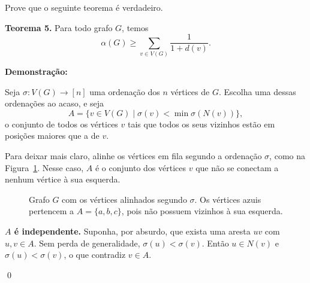 \documentclass[12pt]{article}
\newenvironment{problem}[2][Exercício]{\begin{trivlist}
\item[\hskip \labelsep {\bfseries #1}\hskip \labelsep {\bfseries #2.}]}{\end{trivlist}}
\newenvironment{sol}
    {\textbf{Demonstração:}\emph{}
    }
    {
    \qed
    }
\begin{document}
\begin{problem}{10}
    Prove que o seguinte teorema é verdadeiro.
    
    \textbf{Teorema 5.} Para todo grafo $G$, temos
    \[
        \alpha(G) \ge \sum_{v \in V(G)} \frac{1}{1 + d(v)}.
    \]
\end{problem}
\begin{sol}
    Seja $\sigma: V(G)\rightarrow [n]$ uma ordenação dos $n$ vértices de $G$. Escolha uma dessas ordenações ao acaso, e seja
    \[
        A = \{ v\in V(G) \mid \sigma(v) < \min \sigma(N(v)) \},
    \]
    o conjunto de todos os vértices $v$ tais que todos os seus vizinhos estão em posições maiores que a de $v$.

    Para deixar mais claro, alinhe os vértices em fila segundo a ordenação $\sigma$, como na Figura~\ref{fig:grafo}. Nesse caso, $A$ é o conjunto dos vértices $v$ que não se conectam a nenhum vértice à sua esquerda.

    \begin{figure}[h]
    \centering
    \caption{Grafo $G$ com os vértices alinhados segundo $\sigma$. Os vértices azuis pertencem a $A=\{a,b,c\}$, pois não possuem vizinhos à sua esquerda.}
    \label{fig:grafo}
    \end{figure}

    \textbf{$A$ é independente.} Suponha, por absurdo, que exista uma aresta $uv$ com $u,v\in A$. Sem perda de generalidade, $\sigma(u) < \sigma(v)$. Então $u \in N(v)$ e $\sigma(u)<\sigma(v)$, o que contradiz $v\in A$.


\end{sol}
\end{document}
